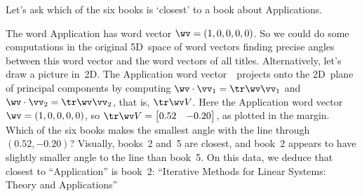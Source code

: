 \begin{reduce}
\begin{example} \label{eg:bks6q}
Let's ask which of the six books is `closest' to a book about Applications.
\begin{solution} 
The word Application has word vector \(\wv=(1,0,0,0,0)\).
So we could do some computations in the original 5D~space of word vectors finding precise angles between this word vector and the word vectors of all titles.
Alternatively, let's draw a picture in~2D.
The Application word vector~\wv\ projects onto the 2D~plane of principal components by computing \(\wv\cdot\vv_1=\tr\wv\vv_1\) and \(\wv\cdot\vv_2=\tr\wv\vv_2\), that is, \(\tr\wv V\).
Here the Application word vector \(\wv=(1,0,0,0,0)\), so \(\tr\wv V=\begin{bmatrix} 0.52 & -0.20 \end{bmatrix}\), as plotted in the margin.
Which of the six books makes the smallest angle with the line through \((0.52,-0.20)\)?
Visually, books~2 and~5 are closest, and book~2 appears to have slightly smaller angle to the line than book~5.
On this data, we deduce that closest to ``Application'' is book~2: ``Iterative Methods for Linear Systems: Theory and Applications''
\end{solution}
\end{example}







\end{reduce}
